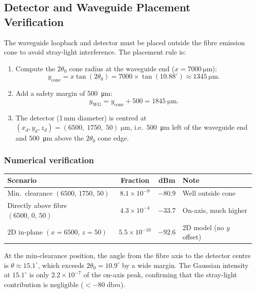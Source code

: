 \subsection{Detector and Waveguide Placement Verification}
\label{sec:placement}

The waveguide loopback and detector must be placed outside the fibre
emission cone to avoid stray-light interference.  The placement rule is:
%
\begin{enumerate}
  \item Compute the $2\theta_0$ cone radius at the waveguide end
        ($x = \SI{7000}{\micro\metre}$):
        \[
          y_\text{cone} = x \tan(2\theta_0)
          = 7000 \times \tan(10.88^\circ)
          \approx \SI{1345}{\micro\metre}.
        \]
  \item Add a safety margin of \SI{500}{\micro\metre}:
        \[
          y_\text{WG} = y_\text{cone} + 500
          = \SI{1845}{\micro\metre}.
        \]
  \item The detector (1\,mm diameter) is centred at
        $(x_d, y_d, z_d) = (6500,\; 1750,\; 50)\;\si{\micro\metre}$,
        i.e.\ \SI{500}{\micro\metre} left of the waveguide end and
        \SI{500}{\micro\metre} above the $2\theta_0$ cone edge.
\end{enumerate}

\subsubsection{Numerical verification}

\begin{center}
\begin{tabular}{@{}lccl@{}}
\toprule
\textbf{Scenario} & \textbf{Fraction} & \textbf{dBm} & \textbf{Note} \\
\midrule
Min.\ clearance $(6500,\,1750,\,50)$ & $8.1\times10^{-9}$ & $-80.9$
  & Well outside cone \\
Directly above fibre $(6500,\,0,\,50)$ & $4.3\times10^{-4}$ & $-33.7$
  & On-axis, much higher \\
2D in-plane $(x\!=\!6500,\,z\!=\!50)$ & $5.5\times10^{-10}$ & $-92.6$
  & 2D model (no $y$ offset) \\
\bottomrule
\end{tabular}
\end{center}

\noindent
At the min-clearance position, the angle from the fibre axis to the
detector centre is $\theta \approx 15.1^\circ$, which exceeds
$2\theta_0 = 10.9^\circ$ by a wide margin.  The Gaussian intensity at
$15.1^\circ$ is only $2.2 \times 10^{-7}$ of the on-axis peak,
confirming that the stray-light contribution is negligible
($< -80\;\si{\decibel m}$).


